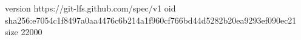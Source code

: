 version https://git-lfs.github.com/spec/v1
oid sha256:e7054c1f8497a0aa4476c6b214a1f960cf766bd44d5282b20ea9293ef090ec21
size 22000
